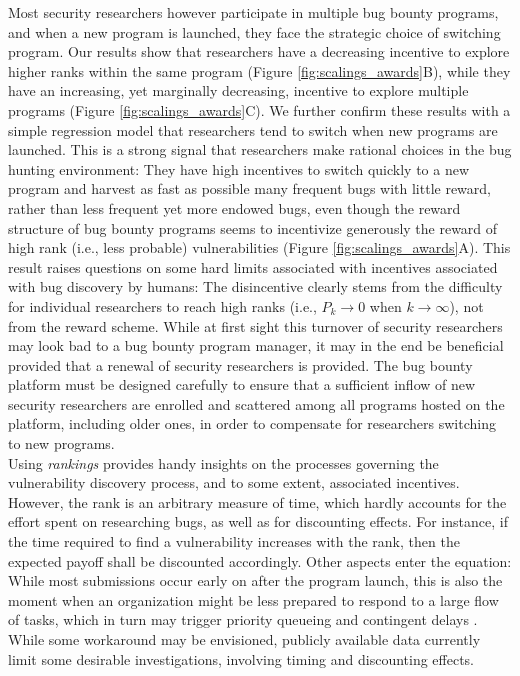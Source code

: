 Most security researchers however participate in multiple bug bounty programs, and when a new program is launched, they face the strategic choice of switching program. Our results show that researchers have a decreasing incentive to explore higher ranks within the same program (Figure \ref{fig:scalings_awards}B), while they have an increasing, yet marginally decreasing, incentive to explore multiple programs (Figure \ref{fig:scalings_awards}C). We further confirm these results with a simple regression model that researchers tend to switch when new programs are launched. This is a strong signal that researchers make rational choices in the bug hunting environment: They have high incentives to switch quickly to a new program and harvest as fast as possible many frequent bugs with little reward, rather than less frequent yet more endowed bugs, even though the reward structure of bug bounty programs seems to incentivize generously the reward of high rank (i.e., less probable) vulnerabilities (Figure \ref{fig:scalings_awards}A). This result raises questions on some hard limits associated with incentives associated with bug discovery by humans: The disincentive clearly stems from the difficulty for individual researchers to reach high ranks (i.e., $P_{k} \rightarrow 0$ when $k \rightarrow \infty$), not from the reward scheme. While at first sight this turnover of security researchers may look bad to a bug bounty program manager, it may in the end be beneficial provided that a renewal of security researchers is provided. The bug bounty platform must be designed carefully to ensure that a sufficient inflow of new security researchers are enrolled and scattered among all programs hosted on the platform, including older ones, in order to compensate for researchers switching to new programs.\\

Using {\it rankings} provides handy insights on the processes governing the vulnerability discovery process, and to some extent, associated incentives. However, the rank is an arbitrary measure of time, which hardly accounts for the effort spent on researching bugs, as well as for discounting effects. For instance, if the time required to find a vulnerability increases with the rank, then the expected payoff shall be discounted accordingly. Other aspects enter the equation: While most submissions occur early on after the program launch, this is also the moment when an organization might be less prepared to respond to a large flow of tasks, which in turn may trigger priority queueing and contingent delays \cite{maillart2011quantification}. While some workaround may be envisioned, publicly available data currently limit some desirable investigations, involving timing and discounting effects.\\

